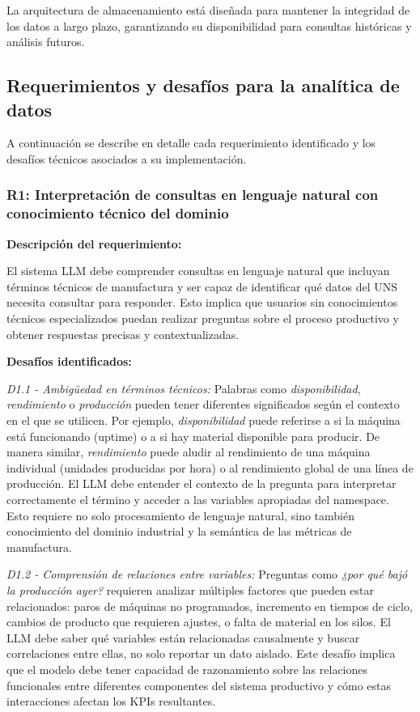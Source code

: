 La arquitectura de almacenamiento está diseñada para mantener la integridad de los datos a largo plazo, garantizando su disponibilidad para consultas históricas y análisis futuros.

\subsection{Requerimientos y desafíos para la analítica de datos}
\label{requerimientosdesafios}

A continuación se describe en detalle cada requerimiento identificado y los desafíos técnicos asociados a su implementación.

\subsubsection{R1: Interpretación de consultas en lenguaje natural con conocimiento técnico del dominio}
\label{req:R1}

\textbf{Descripción del requerimiento:}

El sistema LLM debe comprender consultas en lenguaje natural que incluyan términos técnicos de manufactura y ser capaz de identificar qué datos del UNS necesita consultar para responder. Esto implica que usuarios sin conocimientos técnicos especializados puedan realizar preguntas sobre el proceso productivo y obtener respuestas precisas y contextualizadas.

\textbf{Desafíos identificados:}

\label{des:D1.1}
\textit{D1.1 - Ambigüedad en términos técnicos:} Palabras como \textit{disponibilidad}, \textit{rendimiento} o \textit{producción} pueden tener diferentes significados según el contexto en el que se utilicen. Por ejemplo, \textit{disponibilidad} puede referirse a si la máquina está funcionando (uptime) o a si hay material disponible para producir. De manera similar, \textit{rendimiento} puede aludir al rendimiento de una máquina individual (unidades producidas por hora) o al rendimiento global de una línea de producción. El LLM debe entender el contexto de la pregunta para interpretar correctamente el término y acceder a las variables apropiadas del namespace. Esto requiere no solo procesamiento de lenguaje natural, sino también conocimiento del dominio industrial y la semántica de las métricas de manufactura.

\label{des:D1.2}
\textit{D1.2 - Comprensión de relaciones entre variables:} Preguntas como \textit{¿por qué bajó la producción ayer?} requieren analizar múltiples factores que pueden estar relacionados: paros de máquinas no programados, incremento en tiempos de ciclo, cambios de producto que requieren ajustes, o falta de material en los silos. El LLM debe saber qué variables están relacionadas causalmente y buscar correlaciones entre ellas, no solo reportar un dato aislado. Este desafío implica que el modelo debe tener capacidad de razonamiento sobre las relaciones funcionales entre diferentes componentes del sistema productivo y cómo estas interacciones afectan los KPIs resultantes.

